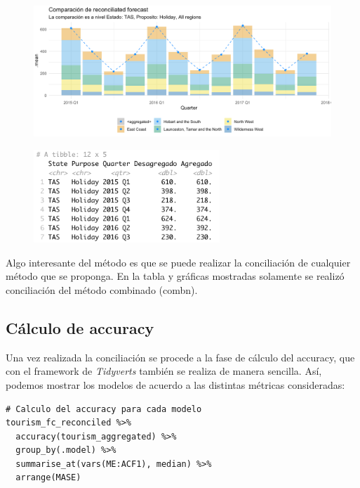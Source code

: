 \begin{figure}[!h]
\centering
      \includegraphics[width=120mm]{imgs/16_reconciled_plot.png}
      \label{fig:snowyplot}
    \end{figure}
    
\begin{figure}[!h]
\centering
      \includegraphics[width=70mm]{imgs/18_reconciled_table.png}
      \label{fig:snowyplot}
    \end{figure}

Algo interesante del método es que se puede realizar la conciliación de cualquier método que se proponga. En la tabla y gráficas mostradas solamente se realizó conciliación del método combinado (combn). 

\newpage 

\subsection{Cálculo de accuracy}

Una vez realizada la conciliación se procede a la fase de cálculo del accuracy, que con el framework de \textit{Tidyverts} también se realiza de manera sencilla. Así, podemos mostrar los modelos de acuerdo a las distintas métricas consideradas:

\begin{lstlisting}
# Calculo del accuracy para cada modelo 
tourism_fc_reconciled %>% 
  accuracy(tourism_aggregated) %>% 
  group_by(.model) %>%
  summarise_at(vars(ME:ACF1), median) %>% 
  arrange(MASE)
\end{lstlisting}


